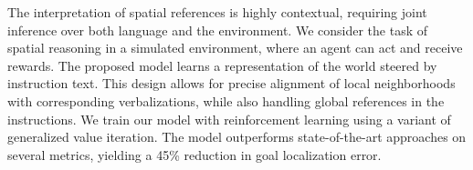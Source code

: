 The interpretation of spatial references is highly contextual, requiring joint inference over both language and the environment. We consider the task of spatial reasoning in a simulated environment, where an agent can act and receive rewards. The proposed model learns a representation of the world steered by instruction text. This design allows for precise alignment of local neighborhoods with corresponding verbalizations, while also handling global references in the instructions. We train our model with reinforcement learning using a variant of generalized value iteration. The model outperforms state-of-the-art approaches on several metrics, yielding a 45\% reduction in goal localization error.